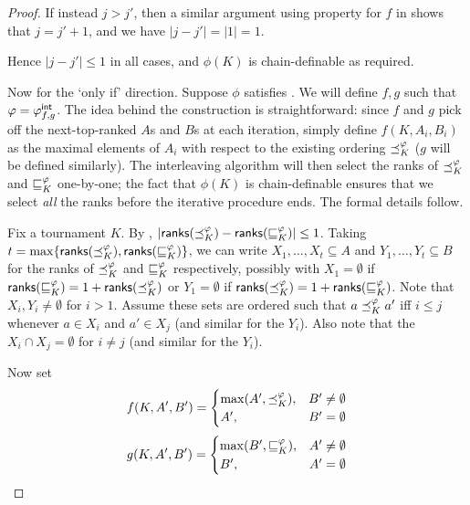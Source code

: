 \begin{proof}
    If instead $j > j'$, then a similar argument using property
     for $f$ in  shows
    that $j = j' + 1$, and we have $|j - j'| = |1| = 1$.

    Hence $|j - j'| \le 1$ in all cases, and $\phi(K)$ is chain-definable as
    required.

    Now for the `only if' direction. Suppose $\phi$ satisfies
    \chaindef{}. We will define $f, g$ such that $\varphi = {\varphi_{f,g}^\mathsf{int}}$.
    The idea behind the construction is straightforward: since $f$ and $g$ pick
    off the next-top-ranked $A$s and $B$s at each iteration, simply define
    $f(K, A_i, B_i)$ as the maximal elements of $A_i$ with respect to the
    existing ordering ${\preceq_K^\varphi}$ ($g$ will be defined similarly). The
    interleaving algorithm will then select the ranks of ${\preceq_K^\varphi}$ and
    ${\sqsubseteq_K^\varphi}$ one-by-one; the fact that $\phi(K)$ is chain-definable
    ensures that we select \emph{all} the ranks before the iterative procedure
    ends. The formal details follow.

    Fix a tournament $K$. By ,
    $|\mathsf{ranks}({{\preceq_K^\varphi}}) - \mathsf{ranks}({{\sqsubseteq_K^\varphi}})| \le 1$. Taking $t =
    \max\{\mathsf{ranks}({{\preceq_K^\varphi}}), \mathsf{ranks}({{\sqsubseteq_K^\varphi}})\}$, we can write $X_1,
    \ldots, X_t \subseteq A$ and $Y_1, \ldots, Y_t \subseteq B$ for the ranks
    of ${\preceq_K^\varphi}$ and ${\sqsubseteq_K^\varphi}$ respectively, possibly with $X_1 =
    \emptyset$ if $\mathsf{ranks}({{\sqsubseteq_K^\varphi}}) = 1 + \mathsf{ranks}({{\preceq_K^\varphi}})$ or $Y_1 =
    \emptyset$ if $\mathsf{ranks}({{\preceq_K^\varphi}}) = 1 + \mathsf{ranks}({{\sqsubseteq_K^\varphi}})$. Note
    that $X_i, Y_i \ne \emptyset$ for $i > 1$. Assume these sets are ordered
    such that $a \preceq_K^\varphi a'$ iff $i \le j$ whenever $a \in X_i$ and $a' \in
    X_j$ (and similar for the $Y_i$). Also note that the $X_i \cap X_j =
    \emptyset$ for $i \ne j$ (and similar for the $Y_i$).

    Now set\footnotemark{}
    \[
        f(K, A', B') = \begin{cases}
           \max(A', {\preceq_K^\varphi}),& B' \ne \emptyset \\
           A',& B' = \emptyset
        \end{cases}
    \]
    \[
        g(K, A', B') = \begin{cases}
            \max(B', {\sqsubseteq_K^\varphi}),& A' \ne \emptyset \\
            B',& A' = \emptyset
        \end{cases}
    \]


\end{proof}
